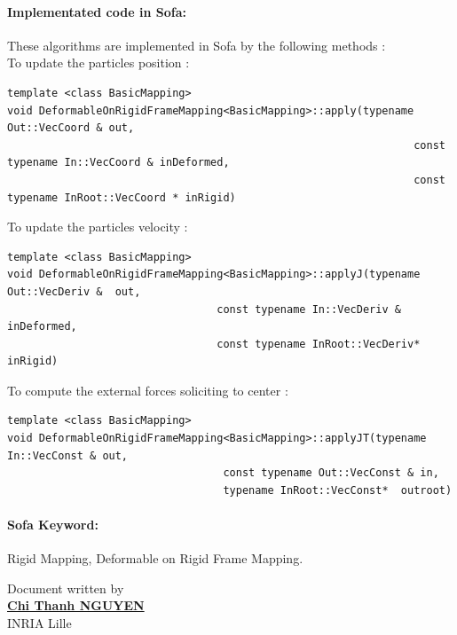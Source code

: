 \documentclass[a4paper,10pt]{article}
\begin{document}
\paragraph{Implementated code in Sofa: }These algorithms are implemented in Sofa by the following methods : \\
To update the particles position :
\begin{lstlisting}
template <class BasicMapping>
void DeformableOnRigidFrameMapping<BasicMapping>::apply(typename Out::VecCoord & out,
                                                                const typename In::VecCoord & inDeformed, 
                                                                const typename InRoot::VecCoord * inRigid)
\end{lstlisting}
To update the particles velocity :
\begin{lstlisting}
template <class BasicMapping>
void DeformableOnRigidFrameMapping<BasicMapping>::applyJ(typename Out::VecDeriv &  out,
								 const typename In::VecDeriv & inDeformed,
								 const typename InRoot::VecDeriv* inRigid)
\end{lstlisting}
To compute the external forces soliciting to center :
\begin{lstlisting}
template <class BasicMapping>
void DeformableOnRigidFrameMapping<BasicMapping>::applyJT(typename In::VecConst & out,
								  const typename Out::VecConst & in,
								  typename InRoot::VecConst*  outroot)

\end{lstlisting}

\paragraph{Sofa Keyword: } Rigid Mapping, Deformable on Rigid Frame Mapping.


						      \begin{flushright}
						      Document written by \\
						      \href{mailto:chi-thanh.nguyen@inria.fr}{{\textbf {Chi Thanh NGUYEN}}} \\
						      INRIA Lille
						      \end{flushright}
\end{document}
